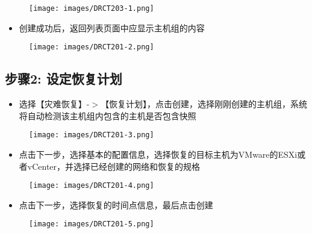 \begin{figure}[htbp]
\centering
\texttt{[image: images/DRCT203-1.png]}
\end{figure}

\begin{itemize}
\item 创建成功后，返回列表页面中应显示主机组的内容

\end{itemize}

\begin{figure}[htbp]
\centering
\texttt{[image: images/DRCT201-2.png]}
\end{figure}

\subsection{步骤2: 设定恢复计划}
\label{步骤2:设定恢复计划}

\begin{itemize}
\item 选择【灾难恢复】-$>$【恢复计划】，点击创建，选择刚刚创建的主机组，系统将自动检测该主机组内包含的主机是否包含快照

\end{itemize}

\begin{figure}[htbp]
\centering
\texttt{[image: images/DRCT201-3.png]}
\end{figure}

\begin{itemize}
\item 点击下一步，选择基本的配置信息，选择恢复的目标主机为VMware的ESXi或者vCenter，并选择已经创建的网络和恢复的规格

\end{itemize}

\begin{figure}[htbp]
\centering
\texttt{[image: images/DRCT201-4.png]}
\end{figure}

\begin{itemize}
\item 点击下一步，选择恢复的时间点信息，最后点击创建

\end{itemize}

\begin{figure}[htbp]
\centering
\texttt{[image: images/DRCT201-5.png]}
\end{figure}

